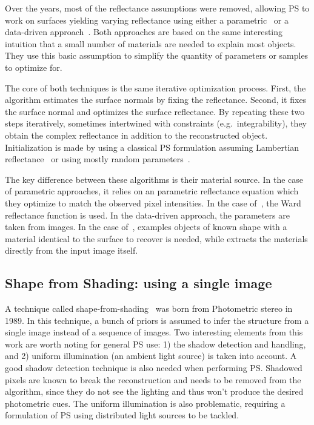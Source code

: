 Over the years, most of the reflectance assumptions were removed, allowing PS to work on surfaces yielding varying reflectance using either a parametric~\cite{goldman-tpami-10} or a data-driven approach~\cite{hertzmann-pami-05,alldrin-cvpr-08}. Both approaches are based on the same interesting intuition that a small number of materials are needed to explain most objects. They use this basic assumption to simplify the quantity of parameters or samples to optimize for.

The core of both techniques is the same iterative optimization process. First, the algorithm estimates the surface normals by fixing the reflectance. Second, it fixes the surface normal and optimizes the surface reflectance. By repeating these two steps iteratively, sometimes intertwined with constraints (e.g.\ integrability), they obtain the complex reflectance in addition to the reconstructed object. Initialization is made by using a classical PS formulation assuming Lambertian reflectance~\cite{goldman-tpami-10} or using mostly random parameters~\cite{alldrin-cvpr-08}.

The key difference between these algorithms is their material source. In the case of parametric approaches, it relies on an parametric reflectance equation which they optimize to match the observed pixel intensities. In the case of~\cite{goldman-tpami-10}, the Ward reflectance function is used. In the data-driven approach, the parameters are taken from images. In the case of~\cite{hertzmann-pami-05}, examples objects of known shape with a material identical to the surface to recover is needed, while \cite{alldrin-cvpr-08} extracts the materials directly from the input image itself.


\subsection{Shape from Shading: using a single image}
A technique called shape-from-shading~\cite{Horn1989} was born from Photometric stereo in 1989. In this technique, a bunch of priors is assumed to infer the structure from a single image instead of a sequence of images. Two interesting elements from this work are worth noting for general PS use: 1) the shadow detection and handling, and 2) uniform illumination (an ambient light source) is taken into account. A good shadow detection technique is also needed when performing PS. Shadowed pixels are known to break the reconstruction and needs to be removed from the algorithm, since they do not see the lighting and thus won't produce the desired photometric cues. The uniform illumination is also problematic, requiring a formulation of PS using distributed light sources to be tackled.

